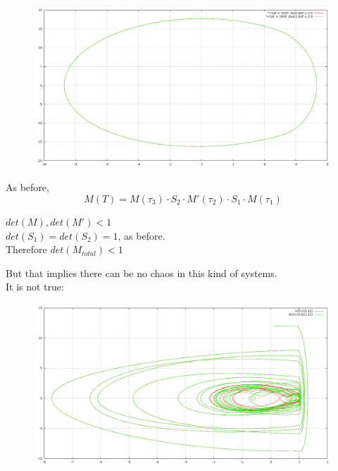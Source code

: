 \documentclass[xcolor=x11names,compress]{beamer}
\renewcommand{\(}{\begin{columns}}
\renewcommand{\)}{\end{columns}}
\newcommand{\<}[1]{\begin{column}{#1}}
\renewcommand{\>}{\end{column}}
\begin{document}
\begin{frame}
\begin{figure}
\begin{center}
\includegraphics[width=0.6\columnwidth]{withdamp}
\end{center}
\end{figure}

As before, 
\[
M(T)= M(\tau_3)\cdot S_2\cdot M'(\tau_2)\cdot S_1\cdot M(\tau_1)
\]

$det(M),det(M')<1$\\
$det(S_1)=det(S_2)=1$, as before.  \\

Therefore $det(M_{total})<1$

\end{frame}


\begin{frame}
But that implies there can be no chaos in this kind of systems.\\
\pause{}
It is not 
true:
\begin{figure}
\begin{center}
\includegraphics[width=0.9\columnwidth]{soft-impact.png}
\end{center}
\end{figure}
\end{frame}
\end{document}
